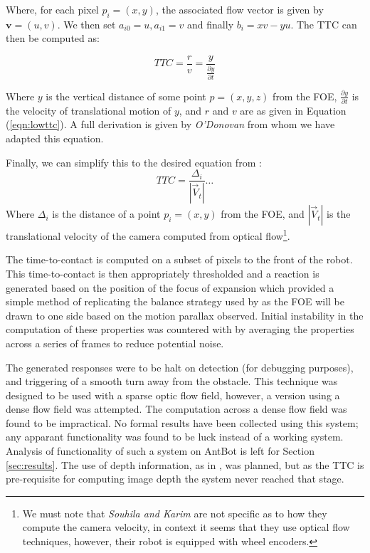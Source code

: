 \documentclass[a4paper,11pt,twoside,openright]{article}
\begin{document}
Where, for each pixel $p_i = (x, y)$, the associated flow vector is given by $\mathbf{v} = (u, v)$.
We then set $a_{i0} = u, a_{i1} = v$ and finally $b_i = xv - yu$. The TTC can then be computed as:

\begin{equation}
  TTC = \frac{r}{v} = \frac{y}{\frac{\partial y}{\partial t}}
\end{equation}

Where $y$ is the vertical distance of some point $p = (x,y,z)$ from the
FOE, $\frac{\partial y}{\partial t}$ is the velocity of translational motion of $y$, and
$r$ and $v$ are as given in Equation (\ref{eqn:lowttc}).
A full derivation is given by \textit{O'Donovan} from whom we have adapted this equation.
\newline

Finally, we can simplify this to the desired equation from \cite{Souhila2007}:
\begin{equation}
TTC = \frac{\Delta_i}{|\vec{V}_t|} \dots
\end{equation}
Where $\Delta_i$ is the distance of a point $p_i = (x,y)$ from the FOE, and $|\vec{V}_t|$ is the
translational velocity of the camera computed from optical flow\footnote{We must note that
\textit{Souhila and Karim} are not specific as to how they compute the camera velocity, in context
it seems that they use optical flow techniques, however, their robot is equipped with wheel encoders.}\cite{Souhila2007}.
\newline

The time-to-contact is computed on a subset of pixels to the front of the robot.
This time-to-contact is then appropriately thresholded and a reaction is generated based on the
position of the focus of expansion which provided a simple method of replicating the balance strategy
used by \cite{Souhila2007} as the FOE will be drawn to one side based on the motion parallax observed.
Initial instability in the computation of these properties was countered with by averaging the properties
across a series of frames to reduce potential noise.
\newline

The generated responses were to be halt on detection (for debugging purposes), and triggering of a
smooth turn away from the obstacle. This technique was designed to be used with a sparse optic flow
field, however, a version using a dense flow field was attempted. The computation across a dense
flow field was found to be impractical. No formal results have been collected using this system; any
apparant functionality was found to be luck instead of a working system. Analysis of functionality
of such a system on AntBot is left for Section \ref{sec:results}. The use of depth information, as in
\cite{Low2005, Souhila2007}, was planned, but as the TTC is pre-requisite for computing image depth the
system never reached that stage.
\end{document}
